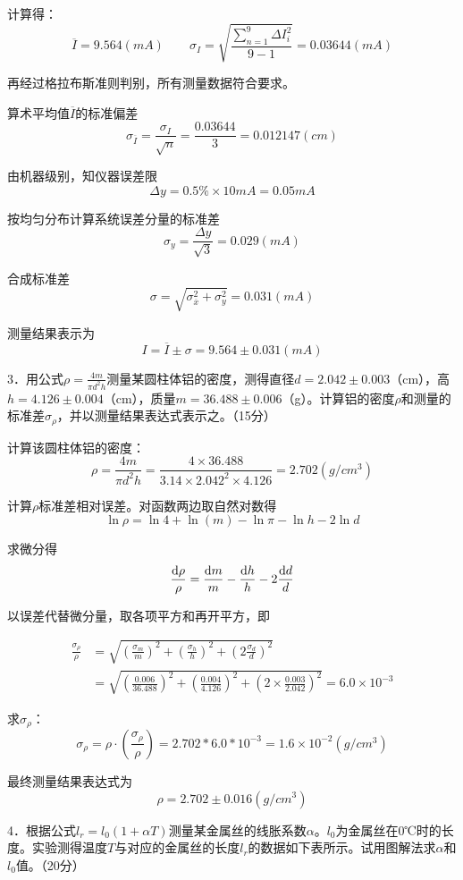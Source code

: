 \documentclass[UTF-8, a4paper, 12pt]{ctexart}
\begin{document}
  计算得：$$\overline I = 9.564(mA) \qquad \sigma_I = \sqrt{\frac{\sum_{n=1}^9 \Delta I_i^2}{9 - 1}} = 0.03644(mA)$$

  再经过格拉布斯准则判别，所有测量数据符合要求。

  算术平均值$\overline I$的标准偏差$$\sigma_{\overline I} = \frac{\sigma_I}{\sqrt n} = \frac{0.03644}{3} = 0.012147(cm)$$

  由机器级别，知仪器误差限$$\Delta y = 0.5\% \times 10mA = 0.05mA$$

  按均匀分布计算系统误差分量的标准差$$\sigma_{y} = \frac{\Delta y}{\sqrt 3} = 0.029(mA)$$

  合成标准差$$\sigma = \sqrt{\sigma_{\overline x}^2 + \sigma_y^2} = 0.031(mA)$$

  测量结果表示为$$I = \overline I \pm \sigma = 9.564 \pm 0.031(mA)$$

  3．用公式$\rho = \frac{4m}{\pi d^2h}$测量某圆柱体铝的密度，测得直径$d=2.042 \pm 0.003$（cm），高$h=4.126\pm 0.004$（cm），质量$m =36.488\pm 0.006$（g）。计算铝的密度$\rho$和测量的标准差$\sigma_\rho$，并以测量结果表达式表示之。（15分）

  计算该圆柱体铝的密度：$$\rho = \frac{4m}{\pi d^2h} = \frac{4 \times 36.488}{3.14 \times 2.042^2 \times 4.126} = 2.702(g/cm^3)$$

  计算$\rho$标准差相对误差。对函数两边取自然对数得$$\ln \rho = \ln 4 + \ln(m) - \ln \pi - \ln h - 2\ln d$$

  求微分得$$\frac{\mathrm d\rho}{\rho} = \frac{\mathrm dm}{m} - \frac{\mathrm dh}{h} - 2\frac{\textrm dd}{d}$$

  以误差代替微分量，取各项平方和再开平方，即
  
  $$\begin{aligned}
    \frac{\sigma_\rho}{\rho} &= \sqrt{(\frac{\sigma_m}{m})^2 + (\frac{\sigma_h}{h})^2 + (2\frac{\sigma_d}{d})^2} \\
    &= \sqrt{(\frac{0.006}{36.488})^2 + (\frac{0.004}{4.126})^2 + (2 \times \frac{0.003}{2.042})^2} = 6.0 \times 10^{-3}
  \end{aligned}$$

  求$\sigma_\rho$：$$\sigma_\rho = \rho \cdot (\frac{\sigma_\rho}{\rho}) = 2.702* 6.0 * 10^{-3} = 1.6 \times 10^{-2}(g/cm^3)$$

  最终测量结果表达式为$$\rho = 2.702 \pm 0.016(g/cm^3)$$

  4．根据公式$l_r=l_0(1+\alpha T)$测量某金属丝的线胀系数$\alpha$。$l_0$为金属丝在0℃时的长度。实验测得温度$T$与对应的金属丝的长度$l_r$的数据如下表所示。试用图解法求$\alpha$和$l_0$值。（20分）
\end{document}
